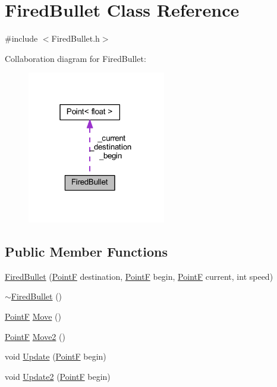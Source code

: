 \hypertarget{class_fired_bullet}{}\section{Fired\+Bullet Class Reference}
\label{class_fired_bullet}


{\ttfamily \#include $<$Fired\+Bullet.\+h$>$}



Collaboration diagram for Fired\+Bullet\+:\nopagebreak
\begin{figure}[H]
\begin{center}
\leavevmode
\includegraphics[width=171pt]{class_fired_bullet__coll__graph}
\end{center}
\end{figure}
\subsection*{Public Member Functions}
\begin{DoxyCompactItemize}
\item 
\hyperlink{class_fired_bullet_a529de1e268d0b6c42250b9990d5b78d0}{Fired\+Bullet} (\hyperlink{drawtools_8h_adc4a66bcb59b74164130ed47cb387ec3}{PointF} destination, \hyperlink{drawtools_8h_adc4a66bcb59b74164130ed47cb387ec3}{PointF} begin, \hyperlink{drawtools_8h_adc4a66bcb59b74164130ed47cb387ec3}{PointF} current, int speed)
\item 
\hyperlink{class_fired_bullet_a81edafb3aafe161e1757cf90d84725df}{$\sim$\+Fired\+Bullet} ()
\item 
\hyperlink{drawtools_8h_adc4a66bcb59b74164130ed47cb387ec3}{PointF} \hyperlink{class_fired_bullet_ad539d4400ec29a8d5acf32894c14c343}{Move} ()
\item 
\hyperlink{drawtools_8h_adc4a66bcb59b74164130ed47cb387ec3}{PointF} \hyperlink{class_fired_bullet_a23c23a8751529c4a6b65cb3834590c4a}{Move2} ()
\item 
void \hyperlink{class_fired_bullet_a2bd7ebc645c7db940bf3c97d57f25267}{Update} (\hyperlink{drawtools_8h_adc4a66bcb59b74164130ed47cb387ec3}{PointF} begin)
\item 
void \hyperlink{class_fired_bullet_a6517ef78bdc537d556083c093ad6ba91}{Update2} (\hyperlink{drawtools_8h_adc4a66bcb59b74164130ed47cb387ec3}{PointF} begin)
\end{DoxyCompactItemize}
